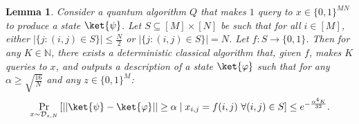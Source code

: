 \documentclass[11pt]{article}%
\newtheorem{lemma}[theorem]{Lemma}
\newcommand{\Naturals}{\mathbb{N}}
\begin{document}
\begin{lemma}
\label{lem:sparse_aaronson_ambainis_single_query_2}
Consider a quantum algorithm $Q$ that makes $1$ query to $x \in \{0,1\}^{MN}$ to produce a state $\ket{\psi}$. Let $S \subseteq [M] \times [N]$ be such that for all $i \in [M]$, either $|\{j: (i, j) \in S\}| \le \frac{N}{2}$ or $|\{j: (i, j) \in S\}| = N$. Let $f: S \to \{0,1\}$. Then for any $K \in \Naturals$, there exists a deterministic classical algorithm that, given $f$, makes $K$ queries to $x$, and outputs a description of a state $\ket{\varphi}$ such that for any $\alpha \ge \sqrt{\frac{16}{N}}$ and any $z \in \{0,1\}^M$:
\[
\Pr_{x \sim \mathcal{D}_{z,N}} \left[|| \ket{\psi} - \ket{\varphi}|| \ge \alpha \mid x_{i,j} = f(i, j)\ \forall (i, j) \in S\right] \le e^{-\frac{\alpha^4 K}{32}}.
\]
\end{lemma}
\end{document}
